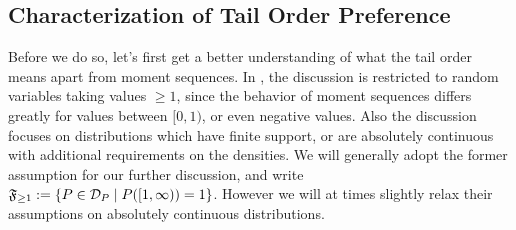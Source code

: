 \documentclass[a4paper]{scrreprt}
\begin{document}
    \subsection{Characterization of Tail Order Preference}
    \newcommand{\Fgeq}{\mathfrak{F}_{\geq 1}} %
    Before we do so, let's first get a better understanding of what the tail order means apart from moment sequences.
    In \cite{bib:rassGameRiskManagI}, the discussion is restricted to random variables taking values $\geq 1$, since the behavior of moment sequences differs greatly for values between $[0, 1)$, or even negative values. Also the discussion focuses on distributions which have finite support, or are absolutely continuous with additional requirements on the densities. We will generally adopt the former assumption for our further discussion, and write $\Fgeq := \set{P \in \DP \mid P([1, \infty)) = 1}$.
    However we will at times slightly relax their assumptions on absolutely continuous distributions.
    
\end{document}
